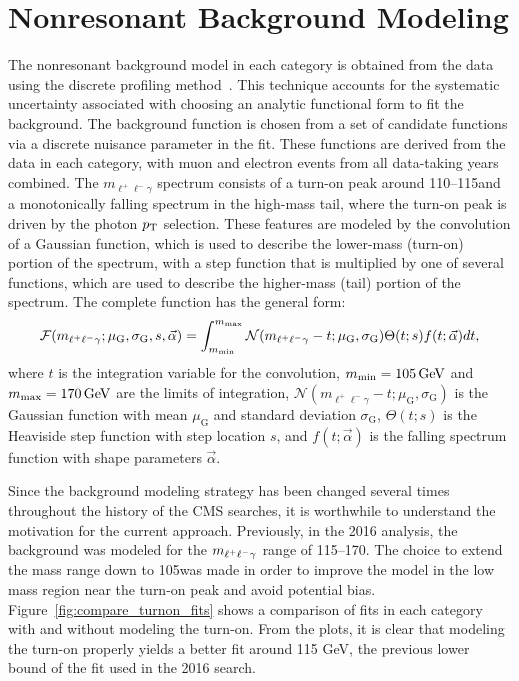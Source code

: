 \section{Nonresonant Background Modeling}
The nonresonant background model in each category is obtained from the data using the discrete profiling method~\cite{Dauncey:2014xga}.
This technique accounts for the systematic uncertainty associated with choosing an analytic functional form to fit the background.
The background function is chosen from a set of candidate functions via a discrete nuisance parameter in the fit.
These functions are derived from the data in each category, with muon and electron events from all data-taking years combined.
The $m_{\ell^+\ell^-\gamma}$ spectrum consists of a turn-on peak around 110--115\GeV and a monotonically falling spectrum in the high-mass tail, where the turn-on peak is driven by the photon $p_{\mathrm{T}}$ selection.
These features are modeled by the convolution of a Gaussian function, which is used to describe the lower-mass (turn-on) portion of the spectrum, with a step function that is multiplied by one of several functions, which are used to describe the higher-mass (tail) portion of the spectrum.
The complete function has the general form:
\begin{equation}
    \mathcal{F}(m_{\ell^{+}\ell^{-}\gamma}; \mu_{\mathrm{G}}, \sigma_{\mathrm{G}}, s, \vec{\alpha}) = \int_{m_\textrm{min}}^{m_\textrm{max}}\mathcal{N}(m_{\ell^{+}\ell^{-}\gamma}-t;\mu_{\mathrm{G}},\sigma_{\mathrm{G}})\Theta(t; s)f(t; \vec{\alpha})dt,
\end{equation}
where $t$ is the integration variable for the convolution, $m_\textrm{min}=105\,\text{Ge\hspace{-.08em}V}$ and $m_\textrm{max}=170\,\text{Ge\hspace{-.08em}V}$ are the limits of integration, $\mathcal{N}(m_{\ell^+\ell^-\gamma}-t;\mu_{\mathrm{G}},\sigma_{\mathrm{G}})$ is the Gaussian function with mean $\mu_{\mathrm{G}}$ and standard deviation $\sigma_{\mathrm{G}}$, $\Theta(t; s)$ is the Heaviside step function with step location $s$, and $f(t; \vec{\alpha})$ is the falling spectrum function with shape parameters $\vec{\alpha}$.

Since the background modeling strategy has been changed several times throughout the history of the CMS \hzg{} searches, 
it is worthwhile to understand the motivation for the current approach. Previously, in the 2016 analysis,
the background was modeled for the $m_{\ell^{+}\ell^{-}\gamma}$ range of 115--170\GeV.
The choice to extend the mass range down to 105\GeV was made in order to improve 
the model in the low mass region near the turn-on peak and avoid potential bias.
Figure~\ref{fig:compare_turnon_fits} shows a comparison of fits in each category with and without modeling the turn-on. From the plots, 
it is clear that modeling the turn-on properly yields a better fit around 115 GeV, the previous lower bound of the fit used in the 2016 search. 

